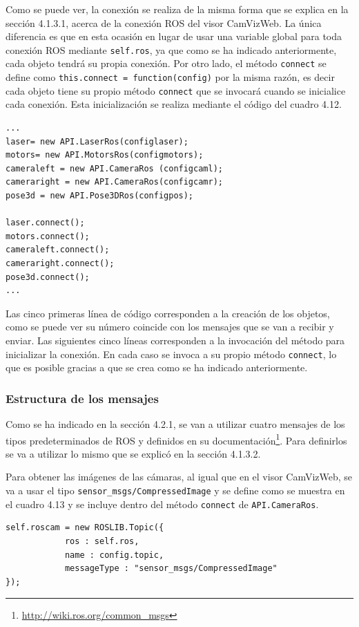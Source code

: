 Como se puede ver, la conexión se realiza de la misma forma que se explica en la sección 4.1.3.1, acerca de la conexión ROS del visor CamVizWeb. La única diferencia es que en esta ocasión en lugar de usar una variable global para toda conexión ROS mediante \texttt{self.ros}, ya que como se ha indicado anteriormente, cada objeto tendrá su propia conexión. Por otro lado, el método \texttt{connect} se define como \texttt{this.connect = function(config)} por la misma razón, es decir cada objeto tiene su propio método \texttt{connect} que se invocará cuando se inicialice cada conexión. Esta inicialización se realiza mediante el código del cuadro 4.12.

\begin{lstlisting}[caption= Creación de cada uno de los objetos de la \textit{API} y su posterior inicialización, label=cod.objetoapiturtlebot]
...
laser= new API.LaserRos(configlaser);
motors= new API.MotorsRos(configmotors);
cameraleft = new API.CameraRos (configcaml);
cameraright = new API.CameraRos(configcamr);
pose3d = new API.Pose3DRos(configpos);
    
laser.connect();
motors.connect();
cameraleft.connect();
cameraright.connect();
pose3d.connect();
...
\end{lstlisting}
Las cinco primeras línea de código corresponden a la creación de los objetos, como se puede ver su número coincide con los mensajes que se van a recibir y enviar. Las siguientes cinco líneas corresponden a la invocación del método para inicializar la conexión. En cada caso se invoca a su propio método \texttt{connect}, lo que es posible gracias a que se crea como se ha indicado anteriormente.

\subsubsection{Estructura de los mensajes}
Como se ha indicado en la sección 4.2.1, se van a utilizar cuatro mensajes de los tipos predeterminados de ROS y definidos en su documentación\footnote{\url{http://wiki.ros.org/common_msgs}}. Para definirlos se va a utilizar lo mismo que se explicó en la sección 4.1.3.2.

Para obtener las imágenes de las cámaras, al igual que en el visor CamVizWeb, se va a usar el tipo \texttt{sensor\_msgs/CompressedImage} y se define como se muestra en el cuadro 4.13 y se incluye dentro del método \texttt{connect} de \texttt{API.CameraRos}.

\begin{lstlisting}[caption= Definición del mensaje para la información de las cámaras, label=cod.mensajecamturtle]
self.roscam = new ROSLIB.Topic({
            ros : self.ros,
            name : config.topic,
            messageType : "sensor_msgs/CompressedImage"
});
\end{lstlisting}

